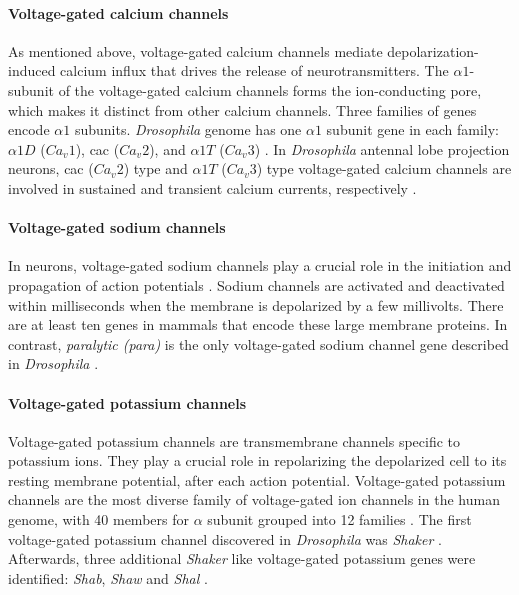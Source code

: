 \paragraph{Voltage-gated calcium channels}
As mentioned above, voltage-gated calcium channels mediate depolarization-induced calcium influx that drives the release of neurotransmitters. The $\alpha1$-subunit of the voltage-gated calcium channels forms the ion-conducting pore, which makes it distinct from other calcium channels. Three families of genes encode $\alpha1$ subunits. \textit{Drosophila} genome has one $\alpha1$ subunit gene in each family: $\alpha1D$ ($Ca_{v}1$), cac ($Ca_{v}2$), and $\alpha1T$ ($Ca_{v}3$) \parencite{Littleton2000, King2007}. In \textit{Drosophila} antennal lobe projection neurons, cac ($Ca_{v}2$) type and $\alpha1T$ ($Ca_{v}3$) type voltage-gated calcium channels are involved in sustained and transient calcium currents, respectively \parencite{Gu2009, Iniguez2013}.

\paragraph{Voltage-gated sodium channels}
In neurons, voltage-gated sodium channels play a crucial role in the initiation and propagation of action potentials \parencite{Hodgkin1952}. Sodium channels are activated and deactivated within milliseconds when the membrane is depolarized by a few millivolts. There are at least ten genes in mammals that encode these large membrane proteins. In contrast, \textit{paralytic (para)} is the only voltage-gated sodium channel gene described in \textit{Drosophila} \parencite{Piggott2019}. %

\paragraph{Voltage-gated potassium channels}
Voltage-gated potassium channels are transmembrane channels specific to potassium ions. They play a crucial role in repolarizing the depolarized cell to its resting membrane potential, after each action potential. Voltage-gated potassium channels are the most diverse family of voltage-gated ion channels in the human genome, with 40 members for $\alpha$ subunit grouped into 12 families \parencite{Gutman2005}. The first voltage-gated potassium channel discovered in \textit{Drosophila} was \textit{Shaker} \parencite{Papazian1987}. Afterwards, three additional \textit{Shaker} like voltage-gated potassium genes were identified: \textit{Shab}, \textit{Shaw} and \textit{Shal} \parencite{Covarrubias1991}. 

